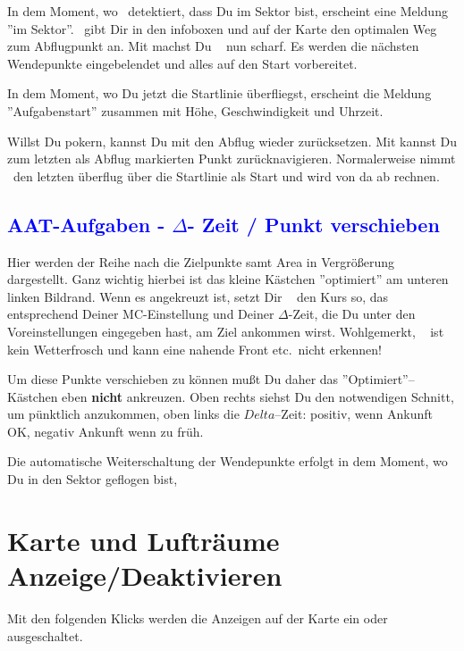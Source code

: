 In dem Moment, wo \xc~detektiert, dass Du im Sektor bist, erscheint eine Meldung ''im Sektor''.
\xc~gibt Dir in den infoboxen und auf der Karte den optimalen Weg zum Abflugpunkt an.
Mit  machst Du \xc~ nun scharf. Es werden die nächsten Wendepunkte eingebelendet
und alles auf den Start vorbereitet.

In dem Moment, wo Du jetzt die Startlinie überfliegst, erscheint die Meldung  ''Aufgabenstart''  zusammen mit Höhe,
Geschwindigkeit und Uhrzeit.

Willst Du pokern, kannst Du mit  den Abflug wieder zurücksetzen.
Mit  kannst Du zum letzten als Abflug markierten Punkt zurücknavigieren. Normalerweise nimmt \xc~den letzten überflug über die Startlinie als Start und wird von da ab rechnen.

\subsection*{\textcolor{blue}{AAT-Aufgaben - $\Delta$- Zeit  / Punkt verschieben}}
\bc{}\ec

Hier werden der Reihe nach die Zielpunkte samt Area in Vergrößerung dargestellt.
Ganz wichtig hierbei ist das kleine Kästchen ''optimiert'' am unteren linken Bildrand.
Wenn es angekreuzt ist, setzt Dir \xc~ den Kurs so, das entsprechend Deiner MC-Einstellung
und Deiner $\Delta$-Zeit, die Du unter den Voreinstellungen eingegeben hast,
am Ziel ankommen wirst. Wohlgemerkt, \xc~ ist kein Wetterfrosch und kann eine nahende Front
etc.\ nicht erkennen!

Um diese Punkte verschieben zu können mußt Du daher das ''Optimiert''--Kästchen eben
 {\bf nicht} ankreuzen. Oben rechts siehst Du den notwendigen Schnitt, um pünktlich
 anzukommen, oben links die $Delta$--Zeit: positiv, wenn Ankunft OK, negativ Ankunft wenn zu früh.
 
 Die automatische Weiterschaltung der Wendepunkte erfolgt in dem Moment, wo Du in den Sektor geflogen bist,
\newpage\section{Karte und Lufträume Anzeige/Deaktivieren}
Mit den folgenden Klicks werden die Anzeigen auf der Karte ein oder ausgeschaltet.
\bc
{}\quad
{}\quad
{}
\ec
